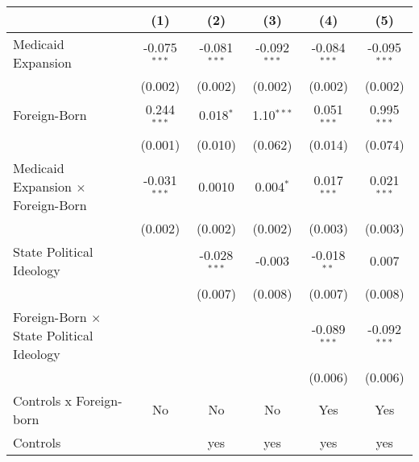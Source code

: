 \documentclass[
]{article}
\let\origtable\table
\let\endorigtable\endtable
\renewenvironment{table}[1][ht]{
      \expandafter\origtable\expandafter[H]
    }{
      \endorigtable
    }
\begin{document}
\begin{table}[htbp]
   \centering
   \begin{threeparttable}[b]
      \caption{The Effect of Medicaid Expansion on Uninsured Rate (Difference-in-Differences Estimation)}
      \begin{tabular}{lccccc}
         \tabularnewline \midrule \midrule
                                                         & (1)            & (2)            & (3)            & (4)            & (5)\\  
         \midrule 
         Medicaid Expansion                              & -0.075$^{***}$ & -0.081$^{***}$ & -0.092$^{***}$ & -0.084$^{***}$ & -0.095$^{***}$\\   
                                                         & (0.002)        & (0.002)        & (0.002)        & (0.002)        & (0.002)\\   
         Foreign-Born                                    & 0.244$^{***}$  & 0.018$^{*}$    & 1.10$^{***}$   & 0.051$^{***}$  & 0.995$^{***}$\\   
                                                         & (0.001)        & (0.010)        & (0.062)        & (0.014)        & (0.074)\\   
         Medicaid Expansion $\times$ Foreign-Born        & -0.031$^{***}$ & 0.0010         & 0.004$^{*}$    & 0.017$^{***}$  & 0.021$^{***}$\\   
                                                         & (0.002)        & (0.002)        & (0.002)        & (0.003)        & (0.003)\\   
         State Political Ideology                        &                & -0.028$^{***}$ & -0.003         & -0.018$^{**}$  & 0.007\\   
                                                         &                & (0.007)        & (0.008)        & (0.007)        & (0.008)\\   
         Foreign-Born $\times$ State Political Ideology  &                &                &                & -0.089$^{***}$ & -0.092$^{***}$\\   
                                                         &                &                &                & (0.006)        & (0.006)\\   
         \midrule 
         Controls x Foreign-born                         & No             & No             & No             & Yes            & Yes\\  
         Controls                                        &                & yes            & yes            & yes            & yes\\  

\end{tabular}
\end{threeparttable}
\end{table}
\end{document}
